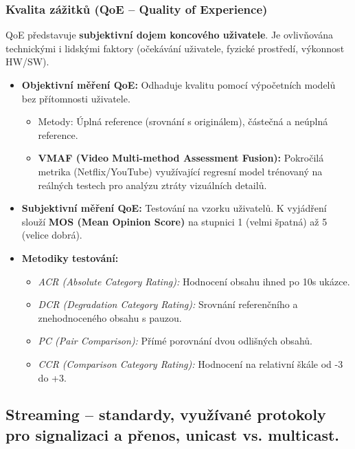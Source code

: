     \subsubsection{Kvalita zážitků (QoE -- Quality of Experience)}
        QoE představuje \textbf{subjektivní dojem koncového uživatele}. Je ovlivňována technickými i lidskými faktory (očekávání uživatele, fyzické prostředí, výkonnost HW/SW).
        \begin{itemize}
            \item \textbf{Objektivní měření QoE:} Odhaduje kvalitu pomocí výpočetních modelů bez přítomnosti uživatele.
            \begin{itemize}
                \item Metody: Úplná reference (srovnání s originálem), částečná a neúplná reference.
                \item \textbf{VMAF (Video Multi-method Assessment Fusion):} Pokročilá metrika (Netflix/YouTube) využívající regresní model trénovaný na reálných testech pro analýzu ztráty vizuálních detailů.
            \end{itemize}
            \item \textbf{Subjektivní měření QoE:} Testování na vzorku uživatelů. K vyjádření slouží \textbf{MOS (Mean Opinion Score)} na stupnici 1 (velmi špatná) až 5 (velice dobrá).
            \item \textbf{Metodiky testování:}
            \begin{itemize}
                \item \textit{ACR (Absolute Category Rating):} Hodnocení obsahu ihned po 10s ukázce.
                \item \textit{DCR (Degradation Category Rating):} Srovnání referenčního a znehodnoceného obsahu s pauzou.
                \item \textit{PC (Pair Comparison):} Přímé porovnání dvou odlišných obsahů.
                \item \textit{CCR (Comparison Category Rating):} Hodnocení na relativní škále od -3 do +3.
            \end{itemize}
        \end{itemize}
\subsection{Streaming – standardy, využívané protokoly pro signalizaci a přenos, unicast vs. multicast. }
